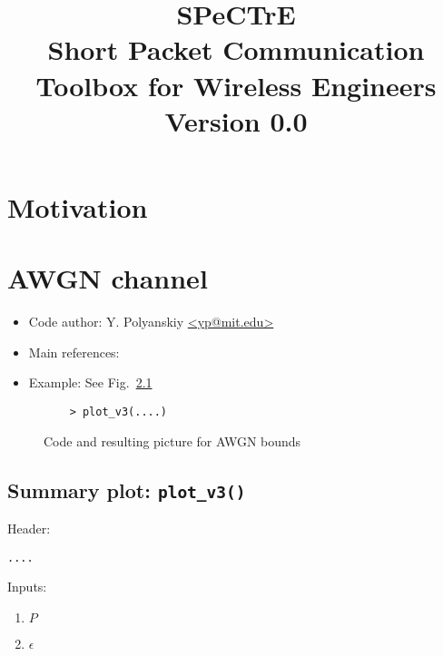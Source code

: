 \documentclass[a4paper,11p]{memoir}
\begin{document}
\title{SPeCTrE\\
Short Packet Communication Toolbox for Wireless Engineers\\[1cm]
Version 0.0}

\maketitle

\begin{abstract}
  
\end{abstract}
\newpage
\tableofcontents

\newpage
\chapter{Motivation}
\chapter{AWGN channel}


\begin{itemize}
\item Code author: Y. Polyanskiy \url{<yp@mit.edu>}

\item Main references: \cite{PPV08,PPV10eneff}

\item Example: See Fig.~\ref{fig:awgn_example} 
\end{itemize}


\begin{figure}
\caption{Code and resulting picture for AWGN bounds}\label{fig:awgn_example}
\begin{verbatim}
	> plot_v3(....)
\end{verbatim}
\end{figure}


\cprotect\section{Summary plot: \verb|plot_v3()|}

Header:
\begin{verbatim}
....
\end{verbatim}


Inputs:
\begin{enumerate}
\item $P$
\item $\epsilon$
\end{enumerate}
\end{document}
